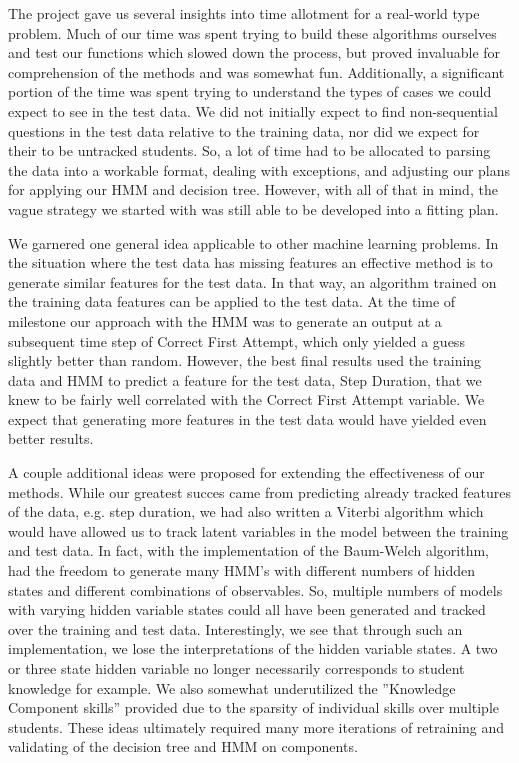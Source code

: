 \documentclass{article} %
\begin{document}
The project gave us several insights into time allotment for a real-world type problem. Much of our time was spent trying to build these algorithms ourselves and test our functions which slowed down the process, but proved invaluable for comprehension of the methods and was somewhat fun. Additionally, a significant portion of the time was spent trying to understand the types of cases we could expect to see in the test data. We did not initially expect to find non-sequential questions in the test data relative to the training data, nor did we expect for their to be untracked students. So, a lot of time had to be allocated to parsing the data into a workable format, dealing with exceptions, and adjusting our plans for applying our HMM and decision tree. However, with all of that in mind, the vague strategy we started with was still able to be developed into a fitting plan.

We garnered one general idea applicable to other machine learning problems. In the situation where the test data has missing features an effective method is to generate similar features for the test data. In that way, an algorithm trained on the training data features can be applied to the test data. At the time of milestone our approach with the HMM was to generate an output at a subsequent time step of Correct First Attempt, which only yielded a guess slightly better than random. However, the best final results used the training data and HMM to predict a feature for the test data, Step Duration, that we knew to be fairly well correlated with the Correct First Attempt variable. We expect that generating more features in the test data would have yielded even better results. 

A couple additional ideas were proposed for extending the effectiveness of our methods. While our greatest succes came from predicting already tracked features of the data, e.g. step duration, we had also written a Viterbi algorithm which would have allowed us to track latent variables in the model between the training and test data. In fact, with the implementation of the Baum-Welch algorithm, had the freedom to generate many HMM's with different numbers of hidden states and  different combinations of observables. So, multiple numbers of models with varying hidden variable states could all have been generated and tracked over the training and test data. Interestingly, we see that through such an implementation, we lose the interpretations of the hidden variable states. A two or three state hidden variable no longer necessarily corresponds to student knowledge for example. We also somewhat underutilized the ''Knowledge Component skills'' provided due to the sparsity of individual skills over multiple students. These ideas ultimately required many more iterations of retraining and validating of the decision tree and HMM on components.
\end{document}
